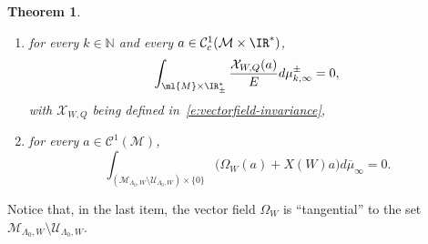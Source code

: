 \documentclass[JEP,XML,SOM,Unicode, NoEqCountersInSection,published]{cedram}
\theoremstyle{plain}
\newtheorem{theo}{Theorem}[section]
\theoremstyle{definition}
\theoremstyle{remark}
\begin{document}
\begin{theo}
\begin{enumerate}
\item
\label{i:invariance_2} for every $k \in \mathbb{N}$ and every $a \in \mathcal{C}^1_c(\mathcal{M}\times\IR^*)$,
\[
\int_{\ml{M}\times\IR_\pm^*} \frac{\mathcal{X}_{W,Q} (a)}{E} d\mu^\pm_{k,\infty} = 0,
\]
with $\mathcal{X}_{W,Q}$ being defined in~\eqref{e:vectorfield-invariance},
\item
\label{i:invariance_3} for every $a \in \mathcal{C}^1(\mathcal{M})$,
\[
\int_{(\mathcal{M}_{\Lambda_0,W}\setminus\mathcal{U}_{\Lambda_0,W})\times\{0\}} \big(\Omega_{W}(a)+X(W)a\big) d\overline{\mu}_{\infty} = 0.
\]
\end{enumerate}
\end{theo}

Notice that, in the last item, the vector field $\Omega_W$ is ``tangential'' to the set $\mathcal{M}_{\Lambda_0,W}\setminus\mathcal{U}_{\Lambda_0,W}$.
\end{document}

